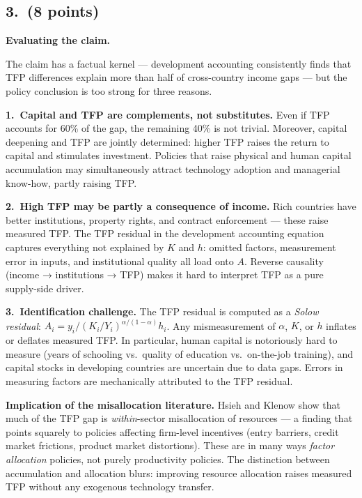 \documentclass[a4paper,11pt]{article}
\begin{document}
\subsection*{3.\ (8 points)}

\begin{answerbox}
\textbf{Evaluating the claim.}

The claim has a factual kernel --- development accounting consistently finds that TFP differences explain more than half of cross-country income gaps --- but the policy conclusion is too strong for three reasons.

\textbf{1.\ Capital and TFP are complements, not substitutes.}  Even if TFP accounts for 60\% of the gap, the remaining 40\% is not trivial.  Moreover, capital deepening and TFP are jointly determined: higher TFP raises the return to capital and stimulates investment.  Policies that raise physical and human capital accumulation may simultaneously attract technology adoption and managerial know-how, partly raising TFP.

\textbf{2.\ High TFP may be partly a consequence of income.}  Rich countries have better institutions, property rights, and contract enforcement --- these raise measured TFP.  The TFP residual in the development accounting equation captures everything not explained by $K$ and $h$: omitted factors, measurement error in inputs, and institutional quality all load onto $A$.  Reverse causality (income → institutions → TFP) makes it hard to interpret TFP as a pure supply-side driver.

\textbf{3.\ Identification challenge.}  The TFP residual is computed as a \emph{Solow residual}: $A_i = y_i / (K_i/Y_i)^{\alpha/(1-\alpha)} h_i$.  Any mismeasurement of $\alpha$, $K$, or $h$ inflates or deflates measured TFP.  In particular, human capital is notoriously hard to measure (years of schooling vs.\ quality of education vs.\ on-the-job training), and capital stocks in developing countries are uncertain due to data gaps.  Errors in measuring factors are mechanically attributed to the TFP residual.

\textbf{Implication of the misallocation literature.}  Hsieh and Klenow show that much of the TFP gap is \emph{within}-sector misallocation of resources --- a finding that points squarely to policies affecting firm-level incentives (entry barriers, credit market frictions, product market distortions).  These are in many ways \emph{factor allocation} policies, not purely productivity policies.  The distinction between accumulation and allocation blurs: improving resource allocation raises measured TFP without any exogenous technology transfer.
\end{answerbox}
\end{document}
